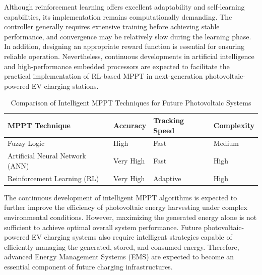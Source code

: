 Although reinforcement learning offers excellent adaptability and self-learning capabilities, its implementation remains computationally demanding. The controller generally requires extensive training before achieving stable performance, and convergence may be relatively slow during the learning phase. In addition, designing an appropriate reward function is essential for ensuring reliable operation. Nevertheless, continuous developments in artificial intelligence and high-performance embedded processors are expected to facilitate the practical implementation of RL-based MPPT in next-generation photovoltaic-powered EV charging stations.
\begin{table}[H]
\caption{Comparison of Intelligent MPPT Techniques for Future Photovoltaic Systems}
\label{tab:mppt_comparison}

\centering
\renewcommand{\arraystretch}{1.5}

\begin{tabularx}{\textwidth}{
>{\raggedright\arraybackslash}p{4.6cm}
>{\centering\arraybackslash}p{2cm}
>{\centering\arraybackslash}p{2.2cm}
>{\centering\arraybackslash}X
}
\toprule

\textbf{MPPT Technique} &
\textbf{Accuracy} &
\textbf{Tracking Speed} &
\textbf{Complexity} \\

\midrule

Fuzzy Logic &
High &
Fast &
Medium \\

Artificial Neural Network (ANN) &
Very High &
Fast &
High \\

Reinforcement Learning (RL) &
Very High &
Adaptive &
High \\

\bottomrule

\end{tabularx}

\end{table}
The continuous development of intelligent MPPT algorithms is expected to further improve the efficiency of photovoltaic energy harvesting under complex environmental conditions. However, maximizing the generated energy alone is not sufficient to achieve optimal overall system performance. Future photovoltaic-powered EV charging systems also require intelligent strategies capable of efficiently managing the generated, stored, and consumed energy. Therefore, advanced Energy Management Systems (EMS) are expected to become an essential component of future charging infrastructures.
